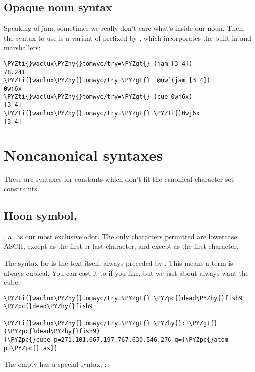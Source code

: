 \subsection{Opaque noun syntax}

Speaking of jam, sometimes we really don't care what's inside our
noun.  Then, the syntax to use is a variant of  prefixed by
\kode{\sig }, which incorporates the built-in  and  marshallers:

\begin{framed_shaded}
\begin{Verbatim}[fontsize=\relsize{-2.5},fontseries=b,commandchars=\\\{\}]
\PYZti{}waclux\PYZhy{}tomwyc/try=\PYZgt{} (jam [3 4])
78.241
\PYZti{}waclux\PYZhy{}tomwyc/try=\PYZgt{} `@uw`(jam [3 4])
0wj6x
\PYZti{}waclux\PYZhy{}tomwyc/try=\PYZgt{} (cue 0wj6x)
[3 4]
\PYZti{}waclux\PYZhy{}tomwyc/try=\PYZgt{} \PYZti{}0wj6x
[3 4]
\end{Verbatim}
\end{framed_shaded}

\section{Noncanonical syntaxes}

These are syntaxes for constants which don't fit the canonical
character-set constraints.

\subsection{Hoon symbol, }

, a , is our most exclusive odor.  The only
characters permitted are lowercase ASCII, \kode{-} except as the first
or last character, and  except as the first character.

The syntax for  is the text itself, always preceded by \kode{\%}.
This means a term is always cubical.  You can cast it to 
if you like, but we just about always want the cube:

\begin{framed_shaded}
\begin{Verbatim}[fontsize=\relsize{-2.5},fontseries=b,commandchars=\\\{\}]
\PYZti{}waclux\PYZhy{}tomwyc/try=\PYZgt{} \PYZpc{}dead\PYZhy{}fish9
\PYZpc{}dead\PYZhy{}fish9

\PYZti{}waclux\PYZhy{}tomwyc/try=\PYZgt{} \PYZhy{}:!\PYZgt{}(\PYZpc{}dead\PYZhy{}fish9)
[\PYZpc{}cube p=271.101.667.197.767.630.546.276 q=[\PYZpc{}atom p=\PYZpc{}tas]]
\end{Verbatim}
\end{framed_shaded}
The empty  has a special syntax, \kode{\$}:

